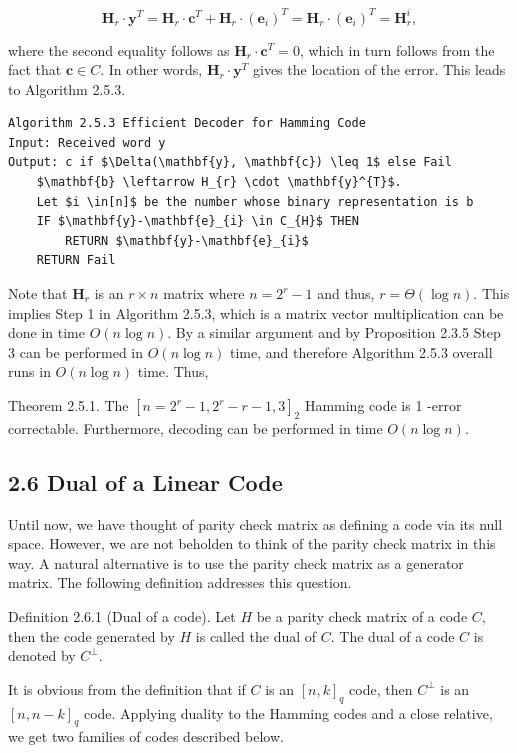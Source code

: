 \documentclass[10pt]{article}
\begin{document}
$$
\mathbf{H}_{r} \cdot \mathbf{y}^{T}=\mathbf{H}_{r} \cdot \mathbf{c}^{T}+\mathbf{H}_{r} \cdot\left(\mathbf{e}_{i}\right)^{T}=\mathbf{H}_{r} \cdot\left(\mathbf{e}_{i}\right)^{T}=\mathbf{H}_{r}^{i},
$$

where the second equality follows as $\mathbf{H}_{r} \cdot \mathbf{c}^{T}=0$, which in turn follows from the fact that $\mathbf{c} \in C$. In other words, $\mathbf{H}_{r} \cdot \mathbf{y}^{T}$ gives the location of the error. This leads to Algorithm 2.5.3.

\begin{lstlisting}[mathescape=true]
Algorithm 2.5.3 Efficient Decoder for Hamming Code
Input: Received word y
Output: c if $\Delta(\mathbf{y}, \mathbf{c}) \leq 1$ else Fail
    $\mathbf{b} \leftarrow H_{r} \cdot \mathbf{y}^{T}$.
    Let $i \in[n]$ be the number whose binary representation is b
    IF $\mathbf{y}-\mathbf{e}_{i} \in C_{H}$ THEN
        RETURN $\mathbf{y}-\mathbf{e}_{i}$
    RETURN Fail
\end{lstlisting}
Note that $\mathbf{H}_{r}$ is an $r \times n$ matrix where $n=2^{r}-1$ and thus, $r=\Theta(\log n)$. This implies Step 1 in Algorithm 2.5.3, which is a matrix vector multiplication can be done in time $O(n \log n)$. By a similar argument and by Proposition 2.3.5 Step 3 can be performed in $O(n \log n)$ time, and therefore Algorithm 2.5.3 overall runs in $O(n \log n)$ time. Thus,

Theorem 2.5.1. The $\left[n=2^{r}-1,2^{r}-r-1,3\right]_{2}$ Hamming code is 1 -error correctable. Furthermore, decoding can be performed in time $O(n \log n)$.

\subsection*{2.6 Dual of a Linear Code}
Until now, we have thought of parity check matrix as defining a code via its null space. However, we are not beholden to think of the parity check matrix in this way. A natural alternative is to use the parity check matrix as a generator matrix. The following definition addresses this question.

Definition 2.6.1 (Dual of a code). Let $H$ be a parity check matrix of a code $C$, then the code generated by $H$ is called the dual of $C$. The dual of a code $C$ is denoted by $C^{\perp}$.

It is obvious from the definition that if $C$ is an $[n, k]_{q}$ code, then $C^{\perp}$ is an $[n, n-k]_{q}$ code. Applying duality to the Hamming codes and a close relative, we get two families of codes described below.
\end{document}
